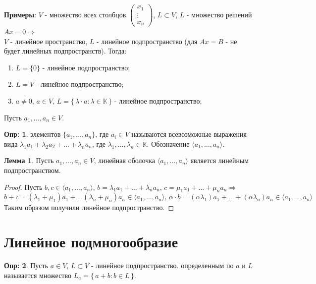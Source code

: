 \documentclass[12pt]{article}
\theoremstyle{definition}
\newtheorem{defn}{Опр:}
\newtheorem{lemma}{Лемма}
\begin{document}
\textbf{Примеры}: $V$ - множество всех столбцов $\begin{pmatrix} x_1\\ \vdots\\x_n \end{pmatrix}$, $L \subset V, \, L$ - множество решений $Ax = 0 \Rightarrow$ \\
$V$ - линейное пространство, $L$ - линейное подпространство (для $Ax =B$ - не будет линейных подпространств). Тогда:
\begin{enumerate}[label={\arabic*)}]
	\item $L = \{0\}$ - линейное подпространство;
	\item $L = V$ - линейное подпространство;
	\item $a \neq 0,\, a\in V, \, L = \{\, \lambda{\cdot}a\colon \lambda \in \mathbb{K} \,\}$ - линейное подпространство;
\end{enumerate}

Пусть $a_1, \dotsc, a_n \in V$.
\begin{defn}
	 элементов $\{a_1, \dotsc, a_n\}$, где $a_i \in V$ называются всевозможные выражения вида $\lambda_1a_1 + \lambda_2 a_2 + \dotsc + \lambda_n a_n$, где $\lambda_1, \dotsc, \lambda_n \in \mathbb{K}$. Обозначение $\langle a_1, \dotsc, a_n\rangle$.
\end{defn}

\begin{lemma}
	Пусть $a_1, \dotsc, a_n \in V$, линейная оболочка $\langle a_1, \dotsc, a_n \rangle$ является линейным подпространством.
\end{lemma}
\begin{proof}
	Пусть $b,c \in \langle a_1, \dotsc, a_n \rangle, \, b = \lambda_1a_1 + \dotsc + \lambda_n a_n, \, c = \mu_1 a_1 + \dotsc + \mu_n a_n \Rightarrow$
	$$b + c = (\lambda_1 + \mu_1)a_1 + \dotsc (\lambda_n + \mu_n)a_n \in \langle a_1, \dotsc, a_n \rangle, \,  \alpha{\cdot}b = (\alpha \lambda_1)a_1 + \dotsc + (\alpha \lambda_n)a_n \in \langle a_1, \dotsc, a_n \rangle$$
	Таким образом получили линейное подпространство.
\end{proof}

\section*{Линейное подмногообразие}
\begin{defn}
	Пусть $a \in V,\, L \subset V$ - линейное подпространство.  определенным по $a$ и $L$ называется множество $L_a = \{\, a + b \colon b \in L \,\}$.
\end{defn}
\end{document}
